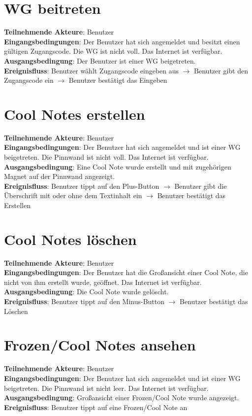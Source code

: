 \documentclass[a4paper]{scrreprt}
\begin{document}
		\section{WG beitreten}
		\textbf{Teilnehmende Akteure}: Benutzer \\
		\textbf{Eingangsbedingungen}: Der Benutzer hat sich angemeldet und besitzt einen gültigen Zugangscode. Die WG ist nicht voll. Das Internet ist verfügbar. \\
		\textbf{Ausgangsbedingung}: Der Benutzer ist einer WG beigetreten. \\
		\textbf{Ereignisfluss}: Benutzer wählt Zugangscode eingeben aus $\rightarrow$ Benutzer gibt den Zugangscode ein $\rightarrow$ Benutzer bestätigt das Eingeben
		
		\section{Cool Notes erstellen}
		\textbf{Teilnehmende Akteure}: Benutzer \\
		\textbf{Eingangsbedingungen}: Der Benutzer hat sich angemeldet und ist einer WG beigetreten. Die Pinnwand ist nicht voll. Das Internet ist verfügbar. \\
		\textbf{Ausgangsbedingung}: Eine Cool Note wurde erstellt und mit zugehörigen Magnet auf der Pinnwand angezeigt. \\
		\textbf{Ereignisfluss}: Benutzer tippt auf den Plus-Button $\rightarrow$ Benutzer gibt die Überschrift mit oder ohne dem Textinhalt ein $\rightarrow$ Benutzer bestätigt das Erstellen
		
		\section{Cool Notes löschen}
		\textbf{Teilnehmende Akteure}: Benutzer \\
		\textbf{Eingangsbedingungen}: Der Benutzer hat die Großansicht einer Cool Note, die nicht von ihm erstellt wurde, geöffnet. Das Internet ist verfügbar. \\
		\textbf{Ausgangsbedingung}: Die Cool Note wurde gelöscht. \\
		\textbf{Ereignisfluss}: Benutzer tippt auf den Minus-Button $\rightarrow$ Benutzer bestätigt das Löschen
		
		\section{Frozen/Cool Notes ansehen}
		\textbf{Teilnehmende Akteure}: Benutzer \\
		\textbf{Eingangsbedingungen}: Der Benutzer hat sich angemeldet und ist einer WG beigetreten. Die Pinnwand ist nicht leer. Das Internet ist verfügbar. \\
		\textbf{Ausgangsbedingung}: Großansicht einer Frozen/Cool Note wurde angezeigt. \\
		\textbf{Ereignisfluss}: Benutzer tippt auf eine Frozen/Cool Note an
		
\end{document}
